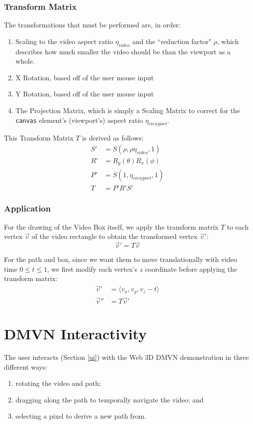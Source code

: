 \subsubsection{Transform Matrix}
The transformations that must be performed are, in order:
\begin{enumerate}
    \item Scaling to the video aspect ratio $\eta_{video}$ and the ``reduction factor" $\rho$, which describes how much smaller the video should be than the viewport as a whole.
    \item X Rotation, based off of the user mouse input
    \item Y Rotation, based off of the user mouse input
    \item The Projection Matrix, which is simply a Scaling Matrix to correct for the \texttt{canvas} element's (viewport's) aspect ratio $\eta_{viewport}$.
\end{enumerate}
This Transform Matrix $T$ is derived as follows:
\begin{align}
    S' & = S(\rho, \rho \eta_{video}, 1) \\
    R' & = R_y(\theta) R_x(\phi) \\
    P' & = S(1, \eta_{viewport}, 1) \\
    T & = P' R' S'
\end{align}

\subsubsection{Application}
For the drawing of the Video Box itself, we apply the transform matrix $T$ to each vertex $\vec{v}$ of the video rectangle to obtain the transformed vertex $\vec{v}'$:
\begin{equation}
    \vec{v}' = T \vec{v}
\end{equation}
\par For the path and box, since we want them to move translationally with video time $0 \leq t \leq 1$, we first modify each vertex's $z$ coordinate before applying the transform matrix:
\begin{align}
    \vec{v}' & = \langle v_x, v_y, v_z - t \rangle \\
    \vec{v}'' & = T \vec{v}'
\end{align}

\section{DMVN Interactivity}
The user interacts (Section \ref{ui}) with the Web 3D DMVN demonstration in three different ways:
\begin{enumerate}
\item rotating the video and path;
\item dragging along the path to temporally navigate the video; and
\item selecting a pixel to derive a new path from.
\end{enumerate}

